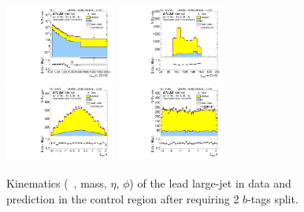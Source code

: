 \clearpage

\begin{figure}[htbp!]
\begin{center}
\includegraphics[width=0.32\textwidth,angle=-90]{figures/boosted/Control/b77_TwoTag_split_Control_leadHCand_Pt_m_1.pdf}
\includegraphics[width=0.32\textwidth,angle=-90]{figures/boosted/Control/b77_TwoTag_split_Control_leadHCand_Mass_s.pdf}\\
\includegraphics[width=0.32\textwidth,angle=-90]{figures/boosted/Control/b77_TwoTag_split_Control_leadHCand_Eta.pdf}
\includegraphics[width=0.32\textwidth,angle=-90]{figures/boosted/Control/b77_TwoTag_split_Control_leadHCand_Phi.pdf}
  \caption{Kinematics (\pt~, mass, $\eta$, $\phi$) of the lead large-\R jet in data and prediction in the control region after requiring 2 $b$-tags split. }
  \label{fig:boosted-2bs-control-ak10-lead}
\end{center}
\end{figure}


